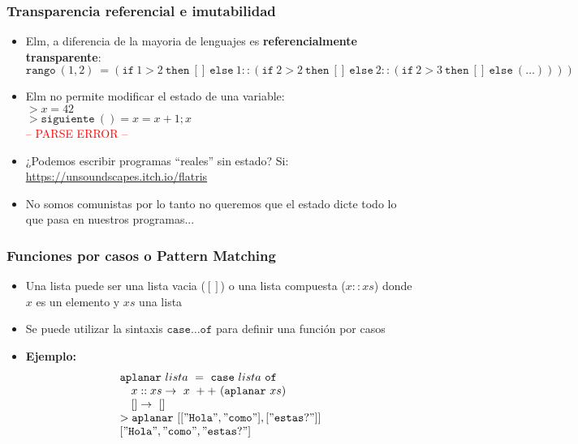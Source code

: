 \documentclass{beamer}
\begin{document}
\begin{frame}
\frametitle{Transparencia referencial e imutabilidad}
\begin{itemize}
    \item{Elm, a diferencia de la mayoria de lenguajes es {\bf referencialmente transparente}:\\
    $\mathtt{rango}\ (1,2)\ =(\mathtt{if}\ 1>2\ \mathtt{then}\ []\ \mathtt{else}
    \ 1::(\mathtt{if}\ 2>2\ \mathtt{then}\ []\ \mathtt{else}\ 2::(\mathtt{if}
    \ 2>3\ \mathtt{then}\ []\ \mathtt{else}\ (\ldots))))$}
    \item{Elm no permite modificar el estado de una variable:\\
    $>x=42$\\
    $>\mathtt{siguiente}\ ()=x=x+1;x$\\
    \textcolor{red}{-- PARSE ERROR --}
    }
    \item{¿Podemos escribir programas ``reales'' sin estado? Si: \url{https://unsoundscapes.itch.io/flatris}}
    \item{No somos comunistas por lo tanto no queremos que el estado dicte todo
    lo que pasa en nuestros programas...}
\end{itemize}
\end{frame}

\begin{frame}
\frametitle{Funciones por casos o Pattern Matching}
\begin{itemize}
    \item{Una lista puede ser una lista vacia ($[]$) o una lista compuesta ($x::xs$) donde
    $x$ es un elemento y $xs$ una lista}
    \item{Se puede utilizar la sintaxis $\mathtt{case} \ldots \mathtt{of}$ para definir una
    funci\'on por casos}
    \item{{\bf Ejemplo:}
    \[
        \begin{array}{l l}
        \multicolumn{2}{l}{\mathtt{aplanar}\ lista\ =\ \mathtt{case}\ lista\ \mathtt{of}}\\
        & x::xs\rightarrow\ x\ ++\ (\mathtt{aplanar}\ xs) \\
        & [] \rightarrow\ [] \\
        \multicolumn{2}{l}{>\mathtt{aplanar}\ [[\mathtt{"Hola"},\mathtt{"como"}], [\mathtt{"estas?"}]]} \\
        \multicolumn{2}{l}{[\mathtt{"Hola"},\mathtt{"como"},\mathtt{"estas?"}]}\
        \end{array}
    \]
    }
\end{itemize}
\end{frame}
\end{document}
